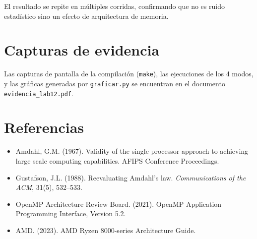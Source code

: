 \documentclass[12pt,letterpaper]{article}
\begin{document}
El resultado se repite en múltiples corridas, confirmando que no es ruido estadístico sino un efecto de arquitectura de memoria.

\section{Capturas de evidencia}

Las capturas de pantalla de la compilación (\texttt{make}), las ejecuciones de los 4 modos, y las gráficas generadas por \texttt{graficar.py} se encuentran en el documento \texttt{evidencia\_lab12.pdf}.

\section*{Referencias}
\begin{itemize}
  \item Amdahl, G.M. (1967). Validity of the single processor approach to achieving large scale computing capabilities. AFIPS Conference Proceedings.
  \item Gustafson, J.L. (1988). Reevaluating Amdahl's law. \textit{Communications of the ACM}, 31(5), 532--533.
  \item OpenMP Architecture Review Board. (2021). OpenMP Application Programming Interface, Version 5.2.
  \item AMD. (2023). AMD Ryzen 8000-series Architecture Guide.
\end{itemize}
\end{document}
